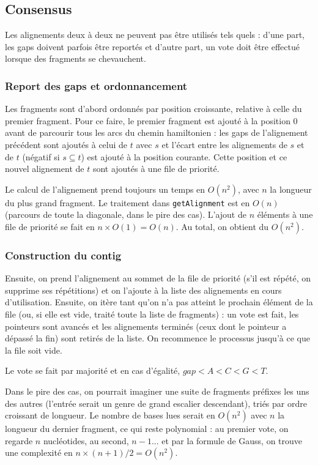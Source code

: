\subsection{Consensus}
Les alignements deux à deux ne peuvent pas être utilisés tels quels :
d'une part, les gaps doivent parfois être reportés et
d'autre part, un vote doit être effectué lorsque des fragments se chevauchent.

\subsubsection{Report des gaps et ordonnancement}
Les fragments sont d'abord ordonnés par position croissante,
relative à celle du premier fragment.
Pour ce faire, le premier fragment est ajouté à la position 0 avant de
parcourir tous les arcs  du chemin hamiltonien :
les gaps de l'alignement précédent sont ajoutés à celui de $t$ avec $s$ et
l'écart entre les alignements de $s$ et de $t$ (négatif si $s\subseteq t$) est
ajouté à la position courante. Cette position et ce nouvel alignement de $t$
sont ajoutés à une file de priorité.

Le calcul de l'alignement prend toujours un temps en $O(n^2)$, avec $n$ la
longueur du plus grand fragment. Le traitement dans \texttt{getAlignment}
est en $O(n)$ (parcours de toute la diagonale, dans le pire des cas).
L'ajout de $n$ éléments à une file de priorité se fait en $n\times O(1)=O(n)$.
Au total, on obtient du $O(n^2)$.

\subsubsection{Construction du contig}
Ensuite, on prend l'alignement au sommet de la file de priorité
(s'il est répété, on supprime ses répétitions) et on l'ajoute à
la liste des alignements en cours d'utilisation.
Ensuite, on itère tant qu'on n'a pas atteint le prochain élément de la file
(ou, si elle est vide, traité toute la liste de fragments) :
un vote est fait, les pointeurs sont avancés et les alignements terminés (ceux
dont le pointeur a dépassé la fin) sont retirés de la liste.
On recommence le processus jusqu'à ce que la file soit vide.

Le vote se fait par majorité et en cas d'égalité, $gap < A < C < G < T$.

Dans le pire des cas, on pourrait imaginer une suite de fragments préfixes les
uns des autres (l'entrée serait un genre de grand escalier descendant),
triés par ordre croissant de longueur. Le nombre de bases lues
serait en $O(n^2)$ avec $n$ la longueur du dernier fragment,
ce qui reste polynomial : au premier vote, on regarde $n$ nucléotides, au
second, $n-1$... et par la formule de Gauss, on trouve une complexité en
$n\times(n+1)/2=O(n^2)$.

